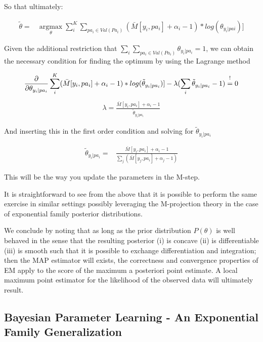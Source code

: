 \documentclass[11pt]{article}
\begin{document}
\begin{article}
So that ultimately:

\begin{align} \label{eq:solution2}
\tilde{\theta} =& \operatorname*{argmax}_{\theta} \sum_i^K  \sum_{pa_i \in Val(Pa_i)} (\bar{M}[y_i, pa_{i}] + \alpha_i - 1) * log(\theta_{y_i | pa{i}})] 
\end{align}

Given the additional restriction that \(\sum_i \sum_{pa_i \in
   Val(Pa_i)} \theta_{y_i | pa_{i}} = 1\), we can obtain the necessary
condition for finding the optimum by using the Lagrange method

\begin{align} \label{eq:first-order1}
\frac{\partial}{\partial \theta_{y_i | pa_{i}}} \sum_i^K (\bar{M}[y_i, pa_{i}] + \alpha_i - 1) * log(\tilde{\theta}_{y_i | pa_{i}})] - \lambda (\sum_i \tilde{\theta}_{y_i | pa_{i}} - 1) \mathrel{\stackon[5pt]{$=$}{$\scriptstyle!$}} 0
\end{align}
\begin{align} \label{eq:first-order2}
\lambda = \frac{\bar{M}[y_i, pa_{i}] + \alpha_i - 1}{\tilde{\theta}_{y_i | pa_{i}}}
\end{align}

And inserting this in the first order condition and solving for
\(\tilde{\theta}_{y_i | pa_{i}}\)

\begin{align} \label{eq:solution}
\tilde{\theta}_{y_i | pa_{i}} =& \frac{\bar{M}[y_i, pa_{i}] + \alpha_i - 1}{\sum_j (\bar{M}[y_j, pa_{i}] + \alpha_j - 1)}
\end{align}

This will be the way you update the parameters in the M-step.

It is straightforward to see from the above that it is possible to
perform the same exercise in similar settings possibly leveraging
the M-projection theory in the case of exponential family posterior
distributions. 

We conclude by noting that as long as the prior distribution
\(P(\theta)\) is well behaved in the sense that the resulting
posterior (i) is concave (ii) is differentiable (iii) is smooth
such that it is possible to exchange differentiation and
integration; then the MAP estimator will exists, the correctness
and convergence properties of EM apply to the score of the maximum
a posteriori point estimate. A local maximum point estimator for
the likelihood of the observed data will ultimately result.

\subsection{Bayesian Parameter Learning - An Exponential Family Generalization}
\label{sec:orgc40a200}


\end{article}
\end{document}
